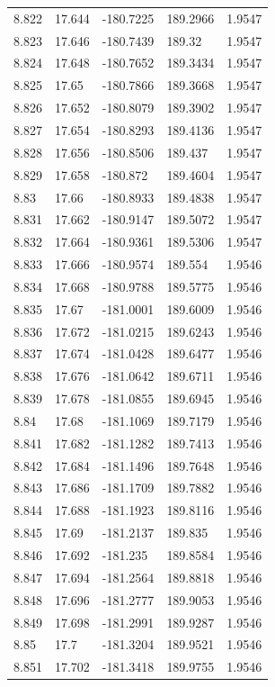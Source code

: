 \begin{tabular}{lllll}
8.822 & 17.644 & -180.7225 & 189.2966 & 1.9547 \\
8.823 & 17.646 & -180.7439 & 189.32 & 1.9547 \\
8.824 & 17.648 & -180.7652 & 189.3434 & 1.9547 \\
8.825 & 17.65 & -180.7866 & 189.3668 & 1.9547 \\
8.826 & 17.652 & -180.8079 & 189.3902 & 1.9547 \\
8.827 & 17.654 & -180.8293 & 189.4136 & 1.9547 \\
8.828 & 17.656 & -180.8506 & 189.437 & 1.9547 \\
8.829 & 17.658 & -180.872 & 189.4604 & 1.9547 \\
8.83 & 17.66 & -180.8933 & 189.4838 & 1.9547 \\
8.831 & 17.662 & -180.9147 & 189.5072 & 1.9547 \\
8.832 & 17.664 & -180.9361 & 189.5306 & 1.9547 \\
8.833 & 17.666 & -180.9574 & 189.554 & 1.9546 \\
8.834 & 17.668 & -180.9788 & 189.5775 & 1.9546 \\
8.835 & 17.67 & -181.0001 & 189.6009 & 1.9546 \\
8.836 & 17.672 & -181.0215 & 189.6243 & 1.9546 \\
8.837 & 17.674 & -181.0428 & 189.6477 & 1.9546 \\
8.838 & 17.676 & -181.0642 & 189.6711 & 1.9546 \\
8.839 & 17.678 & -181.0855 & 189.6945 & 1.9546 \\
8.84 & 17.68 & -181.1069 & 189.7179 & 1.9546 \\
8.841 & 17.682 & -181.1282 & 189.7413 & 1.9546 \\
8.842 & 17.684 & -181.1496 & 189.7648 & 1.9546 \\
8.843 & 17.686 & -181.1709 & 189.7882 & 1.9546 \\
8.844 & 17.688 & -181.1923 & 189.8116 & 1.9546 \\
8.845 & 17.69 & -181.2137 & 189.835 & 1.9546 \\
8.846 & 17.692 & -181.235 & 189.8584 & 1.9546 \\
8.847 & 17.694 & -181.2564 & 189.8818 & 1.9546 \\
8.848 & 17.696 & -181.2777 & 189.9053 & 1.9546 \\
8.849 & 17.698 & -181.2991 & 189.9287 & 1.9546 \\
8.85 & 17.7 & -181.3204 & 189.9521 & 1.9546 \\
8.851 & 17.702 & -181.3418 & 189.9755 & 1.9546 \\

\end{tabular}
